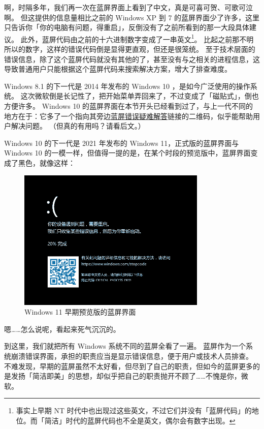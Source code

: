 啊，时隔多年，我们再一次在蓝屏界面上看到了中文，真是可喜可贺、可歌可泣啊。
但这提供的信息量相比之前的 Windows XP 到 7 的蓝屏界面少了许多，这里只告诉你「你的电脑有问题，得重启」，反倒没有了之前所看到的那一大段具体建议。
此外，蓝屏代码由之前的十六进制数字变成了一串英文\footnote{事实上早期 NT 时代中也出现过这些英文，不过它们并没有「蓝屏代码」的地位。而「简洁」时代的蓝屏代码也不全是英文，偶尔会有数字出现。}。
比起之前那不明所以的数字，这样的错误代码倒是显得更直观，但还是很笼统。
至于技术层面的错误信息，除了这个蓝屏代码就没有其他的了，甚至没有与之相关的进程信息，这导致普通用户只能根据这个蓝屏代码来搜索解决方案，增大了排查难度。

Windows 8.1 的下一代是 2014 年发布的 Windows 10 ，是如今广泛使用的操作系统。
这次微软倒是长记性了，把开始菜单弄回来了，不过变成了「磁贴式」，倒也方便许多。
Windows 10 的蓝屏界面在本节开头已经看到过了，与上一代不同的地方在于：它多了一个指向其旁边\href{https://www.windows.com/stopcode}{蓝屏错误疑难解答}链接的二维码，似乎能帮助用户解决问题。
（但真的有用吗？请看后文。）

Windows 10 的下一代是 2021 年发布的 Windows 11，正式版的蓝屏界面与 Windows 10 的一模一样，但值得一提的是，在某个时段的预览版中，蓝屏界面变成了黑色，就像这样：

\begin{figure}[htb!]
  \centering
  \includegraphics[width=9cm]{assets/Win-11-Pre-BSoD.png}
  \caption{Windows 11 早期预览版的蓝屏界面}
  \label{Win-11-Pre-BSoD}
\end{figure}

嗯……怎么说呢，看起来死气沉沉的。

到这里，我们就把所有 Windows 系统不同的蓝屏全看了一遍。
蓝屏作为一个系统崩溃错误界面，承担的职责应当是显示错误信息，便于用户或技术人员排查。
不难发现，早期的蓝屏虽然不太好看，但尽到了自己的职责，但如今的蓝屏更多的是发扬「简洁即美」的思想，却似乎把自己的职责抛开不顾了……不愧是你，微软。

